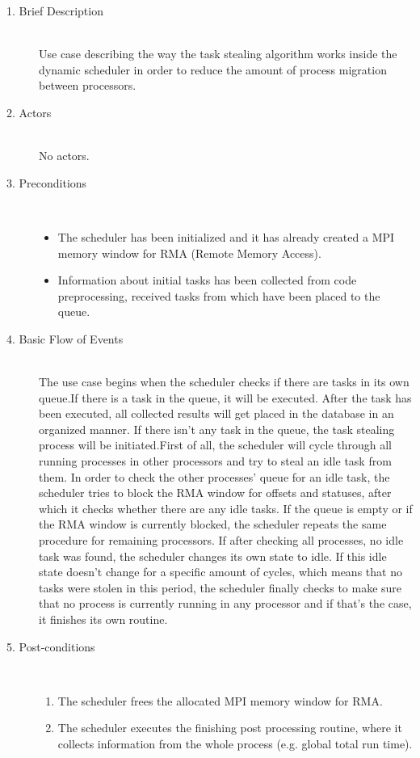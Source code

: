 \begin{description}
	\item [1. Brief Description]\hfill \\
	Use case describing the way the task stealing algorithm works inside the dynamic scheduler in order to reduce the amount of process migration between processors.
	
	\item [2. Actors]\hfill \\
	No actors. 
	
	
	\item [3. Preconditions]\hfill \\
	\vspace{-6.5mm}
	\begin{itemize}
		\item The scheduler has been initialized and it has already created a MPI memory window for RMA (Remote Memory Access).
		\item Information about initial tasks has been collected from code preprocessing, received tasks from which have been placed to the queue.
	\end{itemize}
	
	\item [4. Basic Flow of Events]\hfill \\
	The use case begins when the scheduler checks if there are tasks in its own queue.If there is a task in the queue, it will be executed. After the task has been executed, all collected results will get placed in the database in an organized manner.
	If there isn't any task in the queue, the task stealing process will be initiated.\newline First of all, the scheduler will cycle through all running processes in other processors and try to steal an idle task from them. In order to check the other processes' queue for an idle task, the scheduler tries to block the RMA window for offsets and statuses, after which it checks whether there are any idle tasks. If the queue is empty or if the RMA window is currently blocked, the scheduler repeats the same procedure for remaining processors. If after checking all processes, no idle task was found, the scheduler changes its own state to idle. If this idle state doesn't change for a specific amount of cycles, which means that no tasks were stolen in this period, the scheduler finally checks to make sure that no process is currently running in any processor and if that's the case, it finishes its own routine. 
	
	
	\item [5. Post-conditions]\hfill \\
	\vspace{-6.5mm}
	\begin{enumerate}
		\item The scheduler frees the allocated MPI memory window for RMA.
		\item The scheduler executes the finishing post processing routine, where it collects information from the whole process (e.g. global total run time).
	\end{enumerate}
	

\end{description}
